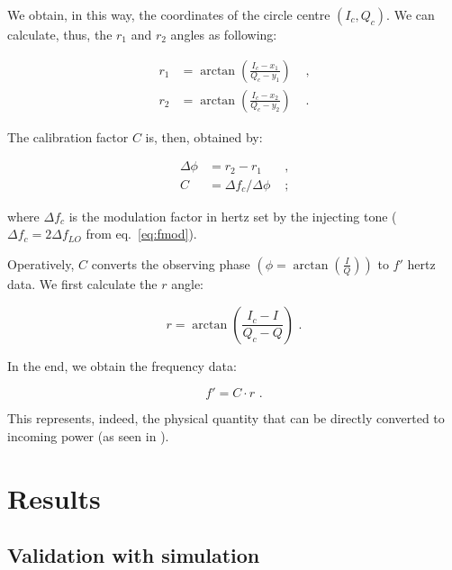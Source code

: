 \documentclass[twocolumn,traditabstract]{aa}\\
\begin{document}
We obtain, in this way, the coordinates of the circle centre $(I_c,Q_c)$. We can calculate, thus, the $r_1$ and $r_2$ angles as following:

\begin{equation}
\begin{align}
r_1 &= \arctan\left( \frac{I_c-x_1}{Q_c - y_1}  \right) &\text{ ,}\\
r_2 &= \arctan\left( \frac{I_c-x_2}{Q_c - y_2}  \right) &\text{ .}
\end{align}
\end{equation}

\noindent The calibration factor $C$ is, then, obtained by:

\begin{equation}
\begin{align}
\Delta \phi &= r_2-r_1 &\text{ ,}\\
C&=\Delta f_c/\Delta\phi &\text{ ;}
\end{align}
\end{equation}

\noindent where $\Delta f_c$ is the modulation factor in hertz set by the injecting tone ($\Delta f_c = 2\Delta f_{LO}$ from eq.~\ref{eq:fmod}).

Operatively, $C$ converts the observing phase $\left( \phi=\arctan\left( \frac{I}{Q} \right) \right)$ to $f'$ hertz data. We first calculate the $r$ angle:


\begin{equation}
r = \arctan \left( \frac{I_c - I}{Q_c - Q} \right) \text{ .}
\end{equation}

\noindent In the end, we obtain the frequency data:

\begin{equation}
f' = C \cdot r \text{ .}
\end{equation}

\noindent This represents, indeed, the physical quantity that can be directly converted to incoming power (as seen in \cite{Swenson}).


\section{Results}
\label{sec:results}

\subsection{Validation with simulation}
\end{document}
